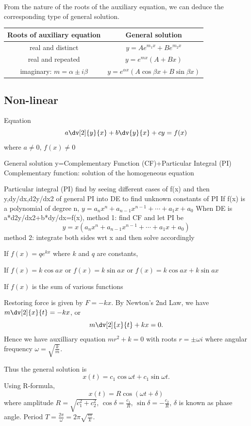 From the nature of the roots of the auxiliary equation, we can deduce the corresponding type of general solution.
\begin{table}[H]
\centering
\begin{tabular}{c|c}
\hline\hline
\textbf{Roots of auxiliary equation} & \textbf{General solution} \\
\hline
real and distinct & $y=Ae^{m_1x}+Be^{m_2x}$ \\
real and repeated & $y=e^{mx}(A+Bx)$ \\
imaginary: $m=\alpha\pm i\beta$ & $y=e^{\alpha x}(A\cos\beta x+B\sin\beta x)$ \\
\hline\hline
\end{tabular}
\end{table}

\subsection{Non-linear}
Equation
\[ a\dv[2]{y}{x} + b\dv{y}{x} +cy = f(x) \]
where $a\neq0$, $f(x)\neq0$

General solution y=Complementary Function (CF)+Particular Integral (PI)
Complementary function: solution of the homogeneous equation

Particular integral (PI)
find by seeing different cases of f(x) and then y,dy/dx,d2y/dx2 of general PI into DE to find unknown constants of PI
If f(x) is a polynomial of degree n, $y=a_nx^n+a_{n-1}x^{n-1}+\cdots+a_1x+a_0$
When DE is a*d2y/dx2+b*dy/dx=f(x),
method 1: find CF and let PI be
\[ y=x(a_nx^n+a_{n-1}x^{n-1}+\cdots+a_1x+a_0) \]
method 2: integrate both sides wrt x and then solve accordingly

If $f(x)=qe^{kx}$ where $k$ and $q$ are constants, 

If $f(x)=k\cos ax$ or $f(x)=k\sin ax$ or $f(x)=k\cos ax+k\sin ax$

If $f(x)$ is the sum of various functions

\begin{example}
Restoring force is given by $F=-kx$. By Newton's 2nd Law, we have $m\dv[2]{x}{t}=-kx$, or
\[ m\dv[2]{x}{t}+kx=0. \]
Hence we have auxilliary equation $mr^2+k=0$ with roots $r=\pm\omega i$ where angular frequency $\omega=\sqrt{\frac{k}{m}}$.

Thus the general solution is
\[ x(t)=c_1\cos\omega t+c_1\sin\omega t. \]
Using R-formula,
\[ x(t)=R\cos(\omega t+\delta) \]
where amplitude $R=\sqrt{c_1^2+c_2^2}$, $\cos\delta=\frac{c_1}{R}$, $\sin\delta=-\frac{c_2}{R}$, $\delta$ is known as phase angle. Period $T=\frac{2\pi}{\omega}=2\pi\sqrt{\frac{m}{k}}$.
\end{example}

